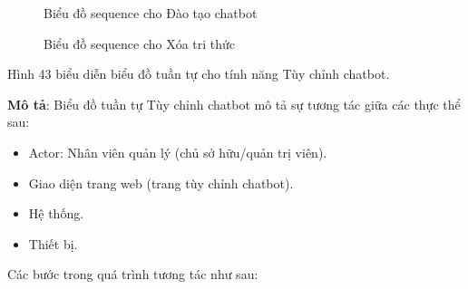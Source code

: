 \begin{figure}[H]
	\centering
	
	\vspace{0.5cm}
	\caption{Biểu đồ sequence cho Đào tạo chatbot}
	\label{fig:enter-label}
\end{figure}

\begin{figure}[H]
	\centering
	
	\vspace{0.5cm}
	\caption{Biểu đồ sequence cho Xóa tri thức}
	\label{fig:enter-label}
\end{figure}

Hình 43 biểu diễn biểu đồ tuần tự cho tính năng Tùy chỉnh chatbot.

\textbf{Mô tả}: Biểu đồ tuần tự Tùy chỉnh chatbot mô tả sự tương tác giữa các thực thể sau:
\begin{itemize}
	\item Actor: Nhân viên quản lý (chủ sở hữu/quản trị viên).
	\item Giao diện trang web (trang tùy chỉnh chatbot).
	\item Hệ thống.
	\item Thiết bị.
\end{itemize}
Các bước trong quá trình tương tác như sau: 

